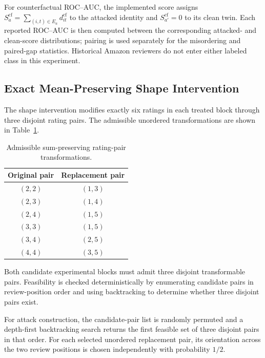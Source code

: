 For counterfactual ROC--AUC, the implemented score assigns
$S_a^{\mathrm{cf}}=\sum_{(i,t)\in E_a}d_{it}^{\mathrm{cf}}$ to the attacked
identity and $S_{a'}^{\mathrm{cf}}=0$ to its clean twin. Each reported
ROC--AUC is then computed between the corresponding attacked- and
clean-score distributions; pairing is used separately for the misordering
and paired-gap statistics. Historical Amazon reviewers do not enter either
labeled class in this experiment.


\subsection{Exact Mean-Preserving Shape Intervention}
\label{sec:supp-shape}

The shape intervention modifies exactly six ratings in each treated block
through three disjoint rating pairs. The admissible unordered transformations
are shown in Table~\ref{tab:supp-shape-transforms}.

\begin{table}[t]
\caption{Admissible sum-preserving rating-pair transformations.}
\label{tab:supp-shape-transforms}
\centering
\small
\begin{tabular}{@{}cc@{}}
\toprule
\textbf{Original pair} & \textbf{Replacement pair} \\
\midrule
$(2,2)$ & $(1,3)$ \\
$(2,3)$ & $(1,4)$ \\
$(2,4)$ & $(1,5)$ \\
$(3,3)$ & $(1,5)$ \\
$(3,4)$ & $(2,5)$ \\
$(4,4)$ & $(3,5)$ \\
\bottomrule
\end{tabular}
\end{table}

Both candidate experimental blocks must admit three disjoint transformable
pairs. Feasibility is checked deterministically by enumerating candidate pairs
in review-position order and using backtracking to determine whether three
disjoint pairs exist.

For attack construction, the candidate-pair list is randomly permuted and a
depth-first backtracking search returns the first feasible set of three
disjoint pairs in that order. For each selected unordered replacement pair,
its orientation across the two review positions is chosen independently with
probability $1/2$.



